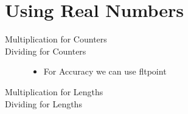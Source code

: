 \documentclass{article}
\begin{document}
	\section{Using Real Numbers}
	\newlength{\Realen}
	
	\begin{description}
		\item[Multiplication for Counters]
			\theRealCount
		\item[Dividing for Counters]
			\theRealCount
			\begin{itemize}
				\item For Accuracy we can use fltpoint
					\setcounter{RealCount}{10}
					\addtocounter{RealCount}{\DivVal}
					\theRealCount
			\end{itemize}
		\item[Multiplication for Lengths]
			\the\Realen
		\item[Dividing for Lengths]
			\addtolength{\Realen}{
				1pt*\ratio{20pt}{2.5pt} %
			}
			\the\Realen
	\end{description}
	
\end{document}
